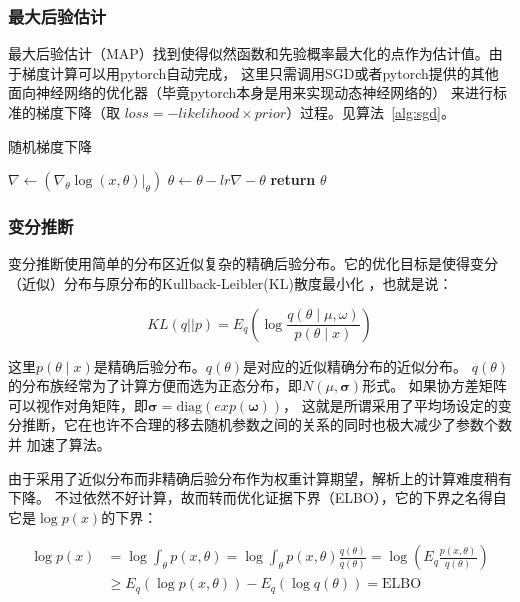 \documentclass{article}
\begin{document}
\subsubsection{最大后验估计}


最大后验估计（MAP）找到使得似然函数和先验概率最大化的点作为估计值。由于梯度计算可以用pytorch自动完成，
这里只需调用SGD或者pytorch提供的其他面向神经网络的优化器（毕竟pytorch本身是用来实现动态神经网络的）
来进行标准的梯度下降（取 $loss = -likelihood \times prior$）过程。见算法~\ref{alg:sgd}。

\begin{algorithm}
\caption{随机梯度下降}
\begin{algorithmic}[1]
 
        \State $\nabla \gets (\nabla_\theta \log(x,\theta)|_{\theta})$
        \State $\theta \gets \theta - lr \nabla -\theta$
    \EndFor
    \State \textbf{return} $\theta$
\EndProcedure
\end{algorithmic}
\label{alg:sgd}
\end{algorithm}

\subsubsection{变分推断}


变分推断使用简单的分布区近似复杂的精确后验分布。它的优化目标是使得变分（近似）分布与原分布的Kullback-Leibler(KL)散度最小化
\cite{blei2017variational}，也就是说：

$$
KL(q||p) = E_q \left( \log \frac{q(\theta \mid \mu,\omega)}{p(\theta \mid x)} \right)
$$


这里$p(\theta \mid x)$是精确后验分布。$q(\theta)$是对应的近似精确分布的近似分布。
$q(\theta)$的分布族经常为了计算方便而选为正态分布，即$N(\mu,\mathbf{\sigma})$形式。
如果协方差矩阵可以视作对角矩阵，即$\mathbf{\sigma}=\mathrm{diag}(exp(\mathbf{\omega}))$，
这就是所谓采用了平均场设定的变分推断，它在也许不合理的移去随机参数之间的关系的同时也极大减少了参数个数并
加速了算法。

由于采用了近似分布而非精确后验分布作为权重计算期望，解析上的计算难度稍有下降。
不过依然不好计算，故而转而优化证据下界（ELBO），它的下界之名得自它是$\log p(x)$的下界：

\begin{align*}
\log p(x) &= \log \int_\theta p(x,\theta) = \log \int_\theta p(x,\theta) \frac{q(\theta)}{q(\theta)} = \log \left( E_q \frac{p(x,\theta)}{q(\theta)} \right)  \\
          &\ge E_q (\log p(x,\theta)) - E_q(\log q(\theta)) = \mathrm{ELBO}
\end{align*}
\end{document}
